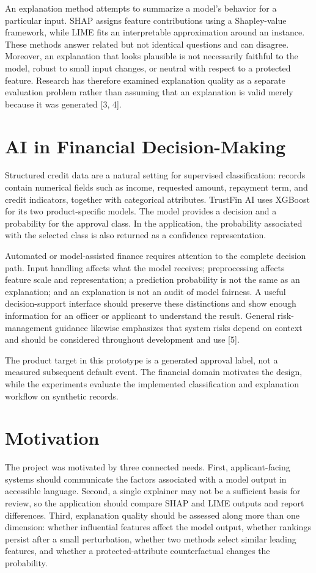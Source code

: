 \documentclass[12pt,a4paper]{report}
\begin{document}
An explanation method attempts to summarize a model’s behavior for a particular input. SHAP assigns feature contributions using a Shapley-value framework, while LIME fits an interpretable approximation around an instance. These methods answer related but not identical questions and can disagree. Moreover, an explanation that looks plausible is not necessarily faithful to the model, robust to small input changes, or neutral with respect to a protected feature. Research has therefore examined explanation quality as a separate evaluation problem rather than assuming that an explanation is valid merely because it was generated [3, 4].

\section{AI in Financial Decision-Making}
Structured credit data are a natural setting for supervised classification: records contain numerical fields such as income, requested amount, repayment term, and credit indicators, together with categorical attributes. TrustFin AI uses XGBoost for its two product-specific models. The model provides a decision and a probability for the approval class. In the application, the probability associated with the selected class is also returned as a confidence representation.

Automated or model-assisted finance requires attention to the complete decision path. Input handling affects what the model receives; preprocessing affects feature scale and representation; a prediction probability is not the same as an explanation; and an explanation is not an audit of model fairness. A useful decision-support interface should preserve these distinctions and show enough information for an officer or applicant to understand the result. General risk-management guidance likewise emphasizes that system risks depend on context and should be considered throughout development and use [5].

The product target in this prototype is a generated approval label, not a measured subsequent default event. The financial domain motivates the design, while the experiments evaluate the implemented classification and explanation workflow on synthetic records.

\section{Motivation}
The project was motivated by three connected needs. First, applicant-facing systems should communicate the factors associated with a model output in accessible language. Second, a single explainer may not be a sufficient basis for review, so the application should compare SHAP and LIME outputs and report differences. Third, explanation quality should be assessed along more than one dimension: whether influential features affect the model output, whether rankings persist after a small perturbation, whether two methods select similar leading features, and whether a protected-attribute counterfactual changes the probability.
\end{document}
